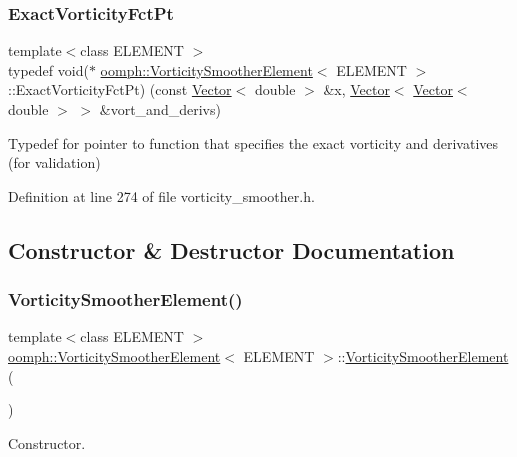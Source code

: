 \subsubsection{\texorpdfstring{Exact\+Vorticity\+Fct\+Pt}{ExactVorticityFctPt}}
{\footnotesize\ttfamily template$<$class E\+L\+E\+M\+E\+NT $>$ \\
typedef void($\ast$ \hyperlink{classoomph_1_1VorticitySmootherElement}{oomph\+::\+Vorticity\+Smoother\+Element}$<$ E\+L\+E\+M\+E\+NT $>$\+::Exact\+Vorticity\+Fct\+Pt) (const \hyperlink{classoomph_1_1Vector}{Vector}$<$ double $>$ \&x, \hyperlink{classoomph_1_1Vector}{Vector}$<$ \hyperlink{classoomph_1_1Vector}{Vector}$<$ double $>$ $>$ \&vort\+\_\+and\+\_\+derivs)}

Typedef for pointer to function that specifies the exact vorticity and derivatives (for validation) 

Definition at line 274 of file vorticity\+\_\+smoother.\+h.



\subsection{Constructor \& Destructor Documentation}
\mbox{\label{classoomph_1_1VorticitySmootherElement_a96098a22de6fbae83a65cd4ee3d53675}} 
\subsubsection{\texorpdfstring{Vorticity\+Smoother\+Element()}{VorticitySmootherElement()}}
{\footnotesize\ttfamily template$<$class E\+L\+E\+M\+E\+NT $>$ \\
\hyperlink{classoomph_1_1VorticitySmootherElement}{oomph\+::\+Vorticity\+Smoother\+Element}$<$ E\+L\+E\+M\+E\+NT $>$\+::\hyperlink{classoomph_1_1VorticitySmootherElement}{Vorticity\+Smoother\+Element} (\begin{DoxyParamCaption}{ }\end{DoxyParamCaption})\hspace{0.3cm}{\ttfamily [inline]}}



Constructor. 



